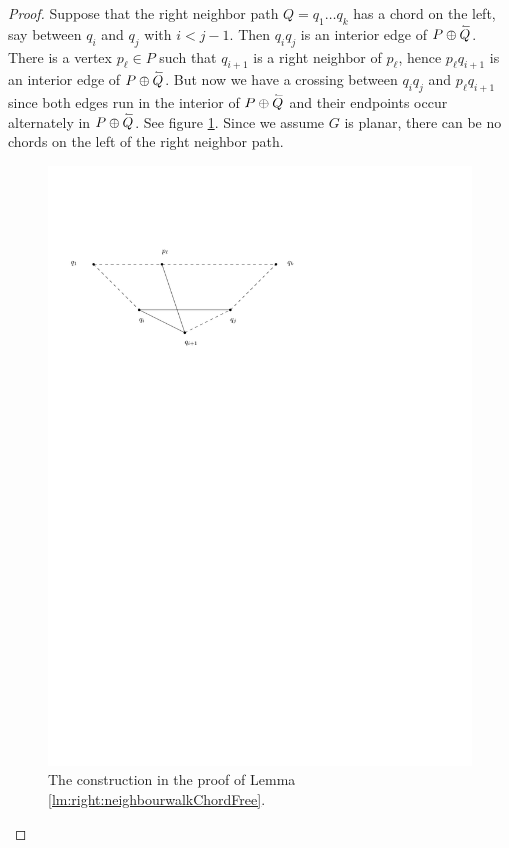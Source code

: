     \begin{proof}
      Suppose that the right neighbor path $Q = q_1 \ldots q_k$  has a chord on the left, say between $q_i$ and $q_j$ with $i< j -1 $. Then $q_i q_j$ is an interior edge of $P \oplus \accentset{\leftharpoonup}{Q}$.  There is a vertex $p_\ell \in P$ such that $q_{i+1}$ is a right neighbor of $p_\ell$, hence $p_\ell q_{i+1}$ is an interior edge of $P \oplus \accentset{\leftharpoonup}{Q}$.
      But now we have a crossing between $q_i q_j$ and $p_\ell q_{i+1}$ since both edges run in the interior of $P \oplus \accentset{\leftharpoonup}{Q}$ and their endpoints occur alternately in $P \oplus \accentset{\leftharpoonup}{Q}$.
      See figure \ref{fig:uni:neihbourwalkChordFree}.
      Since we assume $G$ is planar, there can be no chords on the left of the right neighbor path.

      \begin{figure}[t]
        \centering
        \includegraphics[scale=1]{unifiedAlgo/img/rightNeighbourwalk/neighbourWalkChords}
        \caption{The construction in the proof of Lemma \ref{lm:right:neighbourwalkChordFree}.}
        \label{fig:uni:neihbourwalkChordFree}
      \end{figure}
    \end{proof}
